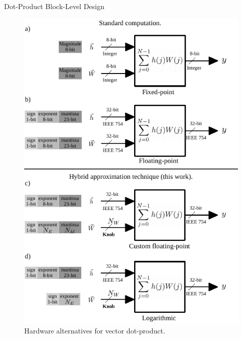 \documentclass[final]{beamer}
\newlength{\onecolwid}
\newlength{\twocolwid}
\begin{document}
\begin{frame}[t]
\begin{columns}[t]
\begin{column}{\twocolwid}
\begin{columns}[t,totalwidth=\twocolwid]
\begin{column}{\onecolwid}
\begin{block}{Dot-Product Block-Level Design}

\begin{figure}
	\includegraphics[width=\linewidth]{../figures/dot-product_unit.pdf}
	\caption{Hardware alternatives for vector dot-product.}
	\label{fig:dot_product_unit}
\end{figure}

\end{block}


\end{column}
\end{columns}
\end{column}
\end{columns}
\end{frame}
\end{document}
